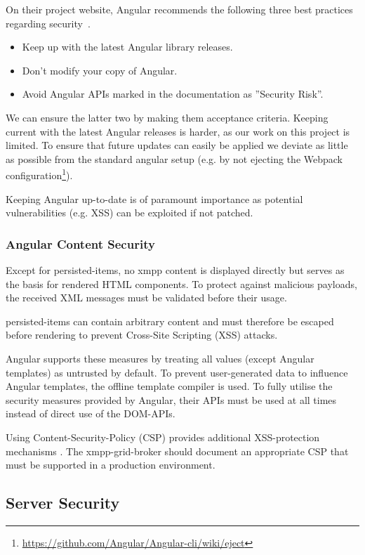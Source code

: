 On their project website, Angular recommends the following three best practices regarding security~\cite{angular-security}.

\begin{itemize}
    \item Keep up with the latest Angular library releases.
    \item Don't modify your copy of Angular.
    \item Avoid Angular APIs marked in the documentation as ''Security Risk''.
\end{itemize}

We can ensure the latter two by making them acceptance criteria.
Keeping current with the latest Angular releases is harder, as our work on this project is limited.
To ensure that future updates can easily be applied we deviate as little as possible from the standard angular setup (e.g. by not ejecting the Webpack configuration\footnote{\url{https://github.com/Angular/Angular-cli/wiki/eject}}).

Keeping Angular up-to-date is of paramount importance as potential vulnerabilities (e.g. XSS) can be exploited if not patched.

\subsubsection{Angular Content Security}

Except for \glspl{persisted-item}, no \gls{xmpp} content is displayed directly but serves as the basis for rendered HTML components.
To protect against malicious payloads, the received XML messages must be validated before their usage.

\Glspl{persisted-item} can contain arbitrary content and must therefore be escaped before rendering to prevent Cross-Site Scripting (XSS) attacks.

Angular supports these measures by treating all values (except Angular templates) as untrusted by default.
To prevent user-generated data to influence Angular templates, the offline template compiler is used. To fully utilise the security measures provided by Angular, their APIs must be used at all times instead of direct use of the DOM-APIs.~\cite{angular-security}

Using Content-Security-Policy (CSP) provides additional XSS-protection mechanisms \cite{w3c-csp}.
The \gls{xmpp-grid-broker} should document an appropriate CSP that must be supported in a production environment.

\subsection{Server Security}

